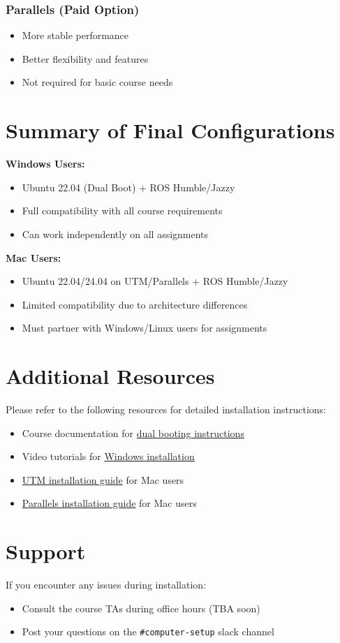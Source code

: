 \documentclass{article}
\begin{document}
\subsubsection{Parallels (Paid Option)}
\begin{itemize}
    \item More stable performance
    \item Better flexibility and features
    \item Not required for basic course needs
\end{itemize}

\section{Summary of Final Configurations}
\begin{tcolorbox}[
    title={Quick Reference Guide},
    colframe=importantblue,
    colback=white
]
\textbf{Windows Users:}
\begin{itemize}
    \item Ubuntu 22.04 (Dual Boot) + ROS Humble/Jazzy
    \item Full compatibility with all course requirements
    \item Can work independently on all assignments
\end{itemize}

\textbf{Mac Users:}
\begin{itemize}
    \item Ubuntu 22.04/24.04 on UTM/Parallels + ROS Humble/Jazzy
    \item Limited compatibility due to architecture differences
    \item Must partner with Windows/Linux users for assignments
\end{itemize}
\end{tcolorbox}

\section{Additional Resources}
Please refer to the following resources for detailed installation instructions:
\begin{itemize}
    \item Course documentation for \href{https://github.com/Dikshuy/dual-boot-Mac-Windows/blob/main/ubuntu-installation.pdf}{dual booting instructions}
    \item Video tutorials for \href{https://www.youtube.com/watch?v=QKn5U2esuRk}{Windows installation} 
    \item \href{https://www.youtube.com/watch?v=O19mv1pe76M}{UTM installation guide} for Mac users 
    \item \href{https://www.youtube.com/watch?v=56n2q6-MXX8&t=305s}{Parallels installation guide} for Mac users 
\end{itemize}

\section{Support}
If you encounter any issues during installation:
\begin{itemize}
    \item Consult the course TAs during office hours (TBA soon)
    \item Post your questions on the \texttt{\#computer-setup} slack channel
\end{itemize}
\end{document}
